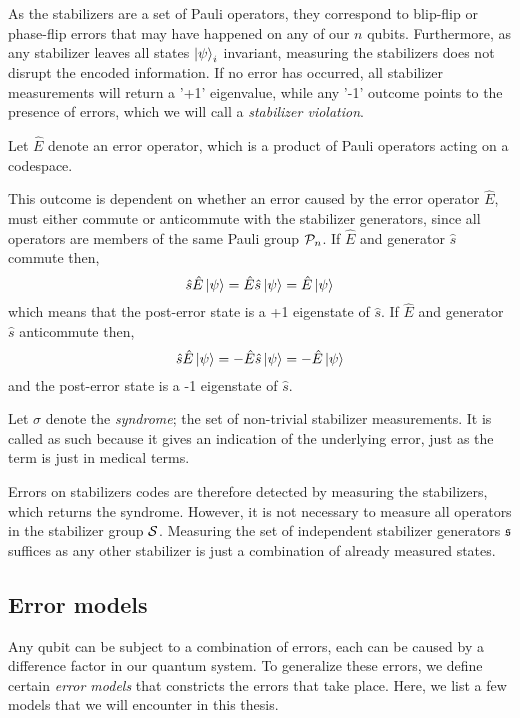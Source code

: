 As the stabilizers are a set of Pauli operators, they correspond to blip-flip or phase-flip errors that may have happened on any of our $n$ qubits. Furthermore, as any stabilizer leaves all states  $\ket{\psi}_i$ invariant, measuring the stabilizers does not disrupt the encoded information. If no error has occurred, all stabilizer measurements will return a '+1' eigenvalue, while any '-1' outcome points to the presence of errors, which we will call a \emph{stabilizer violation}.
\begin{definition}
  Let $\hat{E}$ denote an error operator, which is a product of Pauli operators acting on a codespace. 
\end{definition}
This outcome is dependent on whether an error caused by the error operator $\hat{E}$, must either commute or anticommute with the stabilizer generators, since all operators are members of the same Pauli group $\mathcal{P}_n$. If $\hat{E}$ and generator $\hat{s}$ commute then,
\begin{equation}
  \hat{s}\hat{E}\ket{\psi} = \hat{E}\hat{s}\ket{\psi} = \hat{E}\ket{\psi}
\end{equation}
which means that the post-error state is a +1 eigenstate of $\hat{s}$. If $\hat{E}$ and generator $\hat{s}$ anticommute then,
\begin{equation}\label{qec:eq:stabmeas}
  \hat{s}\hat{E}\ket{\psi} = -\hat{E}\hat{s}\ket{\psi} = -\hat{E}\ket{\psi}
\end{equation}
and the post-error state is a -1 eigenstate of $\hat{s}$. 
\begin{definition}\label{def:syndrome}
  Let $\sigma$ denote the \emph{syndrome}; the set of non-trivial stabilizer measurements. It is called as such because it gives an indication of the underlying error, just as the term is just in medical terms. 
\end{definition}
Errors on stabilizers codes are therefore detected by measuring the stabilizers, which returns the syndrome. However, it is not necessary to measure all operators in the stabilizer group $\mathcal{S}$. Measuring the set of independent stabilizer generators $\mathfrak{s}$ suffices as any other stabilizer is just a combination of already measured states.

\subsection{Error models}\label{qec:sec_errormodels}
Any qubit can be subject to a combination of errors, each can be caused by a difference factor in our quantum system. To generalize these errors, we define certain \emph{error models} that constricts the errors that take place. Here, we list a few models that we will encounter in this thesis. 

